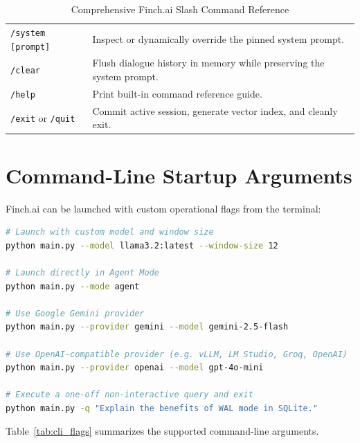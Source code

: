 \begin{table}[htbp]
\begin{tabular}{lp{9.5cm}}
\texttt{/system [prompt]} & Inspect or dynamically override the pinned system prompt. \\
\texttt{/clear} & Flush dialogue history in memory while preserving the system prompt. \\
\texttt{/help} & Print built-in command reference guide. \\
\texttt{/exit} or \texttt{/quit} & Commit active session, generate vector index, and cleanly exit. \\
\bottomrule
\end{tabular}
\caption{Comprehensive Finch.ai Slash Command Reference}
\label{tab:slash_commands}
\end{table}

\section{Command-Line Startup Arguments}
Finch.ai can be launched with custom operational flags from the terminal:

\begin{lstlisting}[language=bash]
# Launch with custom model and window size
python main.py --model llama3.2:latest --window-size 12

# Launch directly in Agent Mode
python main.py --mode agent

# Use Google Gemini provider
python main.py --provider gemini --model gemini-2.5-flash

# Use OpenAI-compatible provider (e.g. vLLM, LM Studio, Groq, OpenAI)
python main.py --provider openai --model gpt-4o-mini

# Execute a one-off non-interactive query and exit
python main.py -q "Explain the benefits of WAL mode in SQLite."
\end{lstlisting}

Table~\ref{tab:cli_flags} summarizes the supported command-line arguments.

